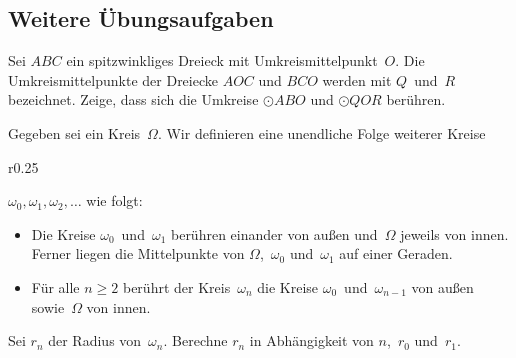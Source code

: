 \subsection*{Weitere Übungsaufgaben}
\begin{aufgabe*}
	Sei $ABC$ ein spitzwinkliges Dreieck mit Umkreismittelpunkt~$O$. Die Umkreismittelpunkte der Dreiecke $AOC$ und $BCO$ werden mit $Q$~und~$R$ bezeichnet. Zeige, dass sich die Umkreise $\odot ABO$ und $\odot QOR$ berühren.
\end{aufgabe*}

\begin{aufgabe*}
	Gegeben sei ein Kreis~$\Omega$. Wir definieren eine unendliche Folge weiterer Kreise
	\begin{wrapfigure}[6]{r}{0.25\textwidth} %
		\centering
	\end{wrapfigure}
	$\omega_0,\omega_1,\omega_2,\dotsc$ wie folgt:
	\begin{itemize}%
		\item Die Kreise $\omega_0$~und~$\omega_1$ berühren einander von außen und~$\Omega$ jeweils von innen. Ferner liegen die Mittelpunkte von $\Omega$,~$\omega_0$ und~$\omega_1$ auf einer Geraden.
		\item Für alle $n\geqslant 2$ berührt der Kreis~$\omega_n$ die Kreise $\omega_0$~und~$\omega_{n-1}$ von außen sowie~$\Omega$ von innen.
	\end{itemize}
	Sei $r_n$ der Radius von~$\omega_n$. Berechne $r_n$ in Abhängigkeit von $n$,~$r_0$ und~$r_1$.
\end{aufgabe*}

